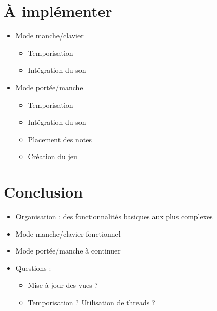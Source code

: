 \documentclass{beamer}
\begin{document}



\section{À implémenter}

	\begin{frame}
		\begin{itemize}
		\item Mode manche/clavier
			\begin{itemize}
				\item Temporisation
				\item Intégration du son
			\end{itemize}
		\item Mode portée/manche
			\begin{itemize}
				\item Temporisation
				\item Intégration du son
				\item Placement des notes
				\item Création du jeu
			\end{itemize}
		\end{itemize}

	\end{frame}




\section{Conclusion}

	\begin{frame}

	\begin{itemize}
		\item Organisation : des fonctionnalités basiques aux plus complexes
		\item Mode manche/clavier fonctionnel
		\item Mode portée/manche à continuer
		\item Questions :
			\begin{itemize}
				\item Mise à jour des vues ?
				\item Temporisation ? Utilisation de threads ?
			\end{itemize}
	\end{itemize}


	\end{frame}
\end{document}
